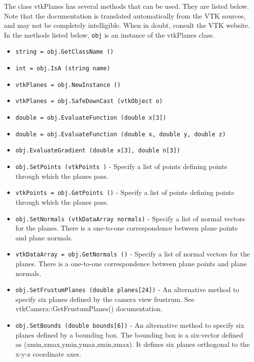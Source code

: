 The class vtkPlanes has several methods that can be used.
  They are listed below.
Note that the documentation is translated automatically from the VTK sources,
and may not be completely intelligible.  When in doubt, consult the VTK website.
In the methods listed below, \verb|obj| is an instance of the vtkPlanes class.
\begin{itemize}
\item  \verb|string = obj.GetClassName ()|

\item  \verb|int = obj.IsA (string name)|

\item  \verb|vtkPlanes = obj.NewInstance ()|

\item  \verb|vtkPlanes = obj.SafeDownCast (vtkObject o)|

\item  \verb|double = obj.EvaluateFunction (double x[3])|

\item  \verb|double = obj.EvaluateFunction (double x, double y, double z)|

\item  \verb|obj.EvaluateGradient (double x[3], double n[3])|

\item  \verb|obj.SetPoints (vtkPoints )| -  Specify a list of points defining points through which the planes pass.

\item  \verb|vtkPoints = obj.GetPoints ()| -  Specify a list of points defining points through which the planes pass.

\item  \verb|obj.SetNormals (vtkDataArray normals)| -  Specify a list of normal vectors for the planes. There is a one-to-one
 correspondence between plane points and plane normals.

\item  \verb|vtkDataArray = obj.GetNormals ()| -  Specify a list of normal vectors for the planes. There is a one-to-one
 correspondence between plane points and plane normals.

\item  \verb|obj.SetFrustumPlanes (double planes[24])| -  An alternative method to specify six planes defined by the camera view 
 frustrum. See vtkCamera::GetFrustumPlanes() documentation.

\item  \verb|obj.SetBounds (double bounds[6])| -  An alternative method to specify six planes defined by a bounding box.
 The bounding box is a six-vector defined as (xmin,xmax,ymin,ymax,zmin,zmax).
 It defines six planes orthogonal to the x-y-z coordinate axes.


\end{itemize}
